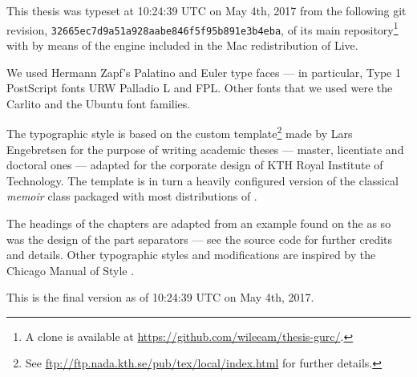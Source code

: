 
\newcommand{\GitTimestamp}{10:24:39 UTC on May 4th, 2017\xspace}
\newcommand{\GitRevisionLong}{\texttt{32665ec7d9a51a928aabe846f5f95b891e3b4eba}\xspace}

This thesis was typeset at \GitTimestamp from the following git revision, \GitRevisionLong, 
of its main repository\footnote{A clone is available at \url{https://github.com/wileeam/thesis-gurc/}.}
with  by means of the  engine  included 
in the Mac redistribution of  Live.

We used Hermann Zapf’s Palatino and Euler type faces --- in particular, Type 1 PostScript 
fonts URW Palladio L and FPL. Other fonts that we used were the Carlito and the 
Ubuntu font families.

The typographic style is based on the custom template\footnote{See \url{ftp://ftp.nada.kth.se/pub/tex/local/index.html} 
for further details.} made by Lars Engebretsen for the purpose of writing academic 
theses --- master, licentiate and doctoral ones --- adapted for the corporate design 
of KTH Royal Institute of Technology. The template is in turn a heavily configured 
version of the classical \emph{memoir} class packaged with most distributions of 
. 

The headings of the chapters are adapted from an example found on the \Internet 
as so was the design of the part separators --- see the source code for further 
credits and details. Other typographic styles and modifications are inspired by 
the Chicago Manual of Style \cite{Chicago10}.

%
%

This is the final version as of \GitTimestamp.
